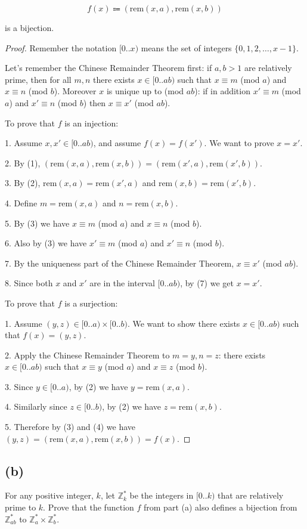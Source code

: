 \documentclass[14pt]{extarticle}
\begin{document}
$$
f(x) \Coloneqq (\text{rem}(x, a), \text{rem}(x, b))
$$

is a bijection.

\begin{proof}
Remember the notation $[0..x)$ means the set of integers $\{0, 1, 2, \ldots, x-1\}$.

Let's remember the Chinese Remainder Theorem first: if $a, b > 1$ are relatively prime, then for all $m, n$ there exists $x \in [0..ab)$ such that $x \equiv m$ (mod $a$) and $x \equiv n$ (mod $b$). Moreover $x$ is unique up to (mod $ab$): if in addition $x' \equiv m$ (mod $a$) and $x' \equiv n$ (mod $b$) then $x \equiv x'$ (mod $ab$).

To prove that $f$ is an injection:

1. Assume $x, x' \in [0..ab)$, and assume $f(x) = f(x')$. We want to prove $x = x'$.

2. By (1), $(\text{rem}(x, a), \text{rem}(x, b)) = (\text{rem}(x', a), \text{rem}(x', b))$.

3. By (2), $\text{rem}(x, a) = \text{rem}(x', a)$ and $\text{rem}(x, b) = \text{rem}(x', b)$.

4. Define $m = \text{rem}(x, a)$ and $n = \text{rem}(x, b)$.

5. By (3) we have $x \equiv m$ (mod $a$) and $x \equiv n$ (mod $b$).

6. Also by (3) we have $x' \equiv m$ (mod $a$) and $x' \equiv n$ (mod $b$).

7. By the uniqueness part of the Chinese Remainder Theorem, $x \equiv x'$ (mod $ab$).

8. Since both $x$ and $x'$ are in the interval $[0..ab)$, by (7) we get $x = x'$.

To prove that $f$ is a surjection:

1. Assume $(y, z) \in [0..a) \times [0..b)$. We want to show there exists $x \in [0..ab)$ such that $f(x) = (y,z)$.

2. Apply the Chinese Remainder Theorem to $m = y, n = z$: there exists $x \in [0..ab)$ such that $x \equiv y$ (mod $a$) and $x \equiv z$ (mod $b$).

3. Since $y \in [0..a)$, by (2) we have $y = \text{rem}(x, a)$.

4. Similarly since $z \in [0..b)$, by (2) we have $z = \text{rem}(x, b)$.

5. Therefore by (3) and (4) we have $(y, z) = (\text{rem}(x, a), \text{rem}(x, b)) = f(x)$.
\end{proof}

\subsection{(b)}
For any positive integer, $k$, let $\mathbb{Z}_k^*$ be the integers in $[0..k)$ that are relatively prime to $k$. Prove that the function $f$ from part (a) also defines a bijection from $\mathbb{Z}_{ab}^*$ to $\mathbb{Z}_a^* \times \mathbb{Z}_b^*$.
\end{document}
